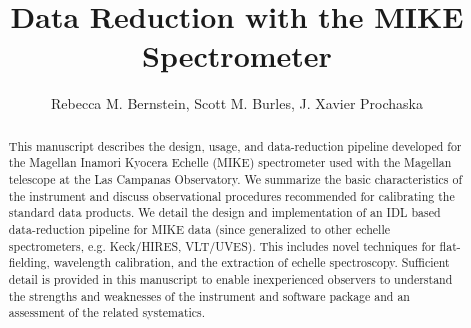 \documentclass[12pt,preprint]{aastex}
\begin{document}
\newcommand{\ndla}{71}
\newcommand{\kms}{km~s$^{-1}$ }
\newcommand{\cm}[1]{\, {\rm cm^{#1}}}
\newcommand{\mkms}{{\rm \; km\;s^{-1}}}
\newcommand{\delv}{\Delta v}
\newcommand{\ohi}{$\Omega_g$}
\newcommand{\lya}{Ly$\alpha$}
\newcommand{\nv}{N\,V}
\newcommand{\ovi}{O\,VI}
\newcommand{\N}[1]{{N({\rm #1})}}
\newcommand{\sci}[1]{{\rm \; \times \; 10^{#1}}}
\newcommand{\slla}{SLLS0927+5621}
\newcommand{\sllb}{SLLS0953+5230}
\newcommand{\mnhi}{N_{\rm HI}}
\newcommand{\mnciv}{N_{\rm CIV}}
\newcommand{\nhi}{$N_{\rm HI}$}
\def\fnhi{$f_{\rm{HI}} (\mnhi)$}
\def\mfnhi{f_{\rm{HI}} (\mnhi)}
\def\ltk{\left [ \,}
\def\ltp{\left ( \,}
\def\ltb{\left \{ \,}
\def\rtk{\, \right  ] }
\def\rtp{\, \right  ) }
\def\rtb{\, \right \} }
\def\nhi{$N_{\rm HI}$}
\def\lnhi{$\log N_{HI}$}
\def\omt{$\Omega_m^{Total}$}
\def\momt{\Omega_m^{Total}}

\title{Data Reduction with the MIKE Spectrometer}%

\author{
Rebecca M. Bernstein,
Scott M. Burles,
J. Xavier Prochaska}


\begin{abstract}
This manuscript describes the design, usage, and data-reduction
pipeline developed for the Magellan Inamori Kyocera Echelle (MIKE)
spectrometer used with the Magellan telescope at the Las Campanas
Observatory.  We summarize the basic characteristics of the
instrument and discuss observational procedures recommended 
for calibrating the standard data products.  We detail the design
and implementation of an IDL based data-reduction pipeline for
MIKE data (since generalized to other echelle spectrometers, e.g. 
Keck/HIRES, VLT/UVES).
This includes novel techniques for flat-fielding, wavelength calibration,
and the extraction of echelle spectroscopy.
Sufficient detail is provided in this manuscript to enable
inexperienced observers to understand the strengths and weaknesses
of the instrument and software package and an assessment of the
related systematics.

\end{abstract}

\end{document}
